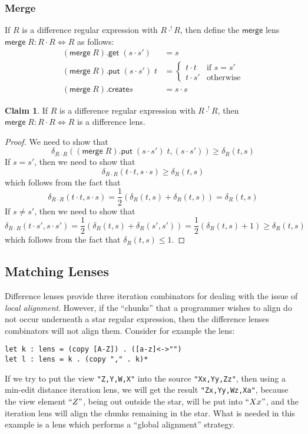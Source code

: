 \documentclass[acmsmall,review,anonymous]{acmart}\settopmatter{printfolios=true,printccs=false,printacmref=false}
\theoremstyle{definition}
\newtheorem{claim}{Claim}
\newcommand{\kw}[1]{\ensuremath{\mathsf{#1}}\xspace}
\newcommand{\get}{\ensuremath{\kw{get}}\xspace}
\newcommand{\pput}{\ensuremath{\kw{put}}\xspace}
\newcommand{\create}{\ensuremath{\kw{create}}\xspace}
\newcommand{\mergelens}{\ensuremath{\kw{merge}}\xspace}
\begin{document}
\subsubsection{Merge}
If $R$ is a difference regular expression with $R \cdot^! R$, then define the \mergelens lens $\mergelens \; R : R \cdot R \Leftrightarrow R$ as follows:
\begin{align*}
(\mergelens \; R).\get \; (s \cdot s') &= s\\
(\mergelens \; R).\pput \; (s \cdot s') \; t &= 
\begin{cases}
t \cdot t & \text{if }s = s'\\
t \cdot s' & \text{otherwise}
\end{cases}\\
(\mergelens \; R).\create s &= s \cdot s
\end{align*}
\begin{claim}
If $R$ is a difference regular expression with $R \cdot^! R$, then $\mergelens \; R : R \cdot R \Leftrightarrow R$ is a difference lens.
\end{claim}
\begin{proof}
We need to show that
$$\delta_{R \cdot R}((\mergelens \; R).\pput \; (s \cdot s') \; t, (s \cdot s')) \geq \delta_R(t, s)$$
If $s = s'$, then we need to show that
$$\delta_{R \cdot R}(t \cdot t, s \cdot s) \geq \delta_R(t, s)$$
which follows from the fact that
$$\delta_{R \cdot R}(t \cdot t, s \cdot s) = \frac{1}{2}\left(\delta_R(t, s) + \delta_R(t, s)\right) = \delta_R(t, s)$$
If $s \neq s'$, then we need to show that
$$\delta_{R \cdot R}(t \cdot s', s \cdot s') = \frac{1}{2}\left(\delta_R(t, s) + \delta_R(s', s')\right) = \frac{1}{2}\left(\delta_R(t, s) + 1\right) \geq \delta_R(t, s)$$
which follows from the fact that $\delta_R(t, s) \leq 1$.
\end{proof}
\subsection{Matching Lenses}
Difference lenses provide three iteration combinators for dealing with the issue of {\em local alignment}. However, if the ``chunks'' that a programmer wishes to align do not occur underneath a star regular expression, then the difference lenses combinators will not align them. Consider for example the lens:
\begin{lstlisting}
let k : lens = (copy [A-Z]) . ([a-z]<->"")
let l : lens = k . (copy "," . k)*
\end{lstlisting}
If we try to put the view \lstinline|"Z,Y,W,X"| into the source \lstinline|"Xx,Yy,Zz"|, then using a min-edit distance iteration lens, we will get the result \lstinline|"Zx,Yy,Wz,Xa"|, because the view element $``Z"$, being out outside the star, will be put into $``Xx"$, and the iteration lens will align the chunks remaining in the star. What is needed in this example is a lens which performs a ``global alignment'' strategy.
\end{document}
